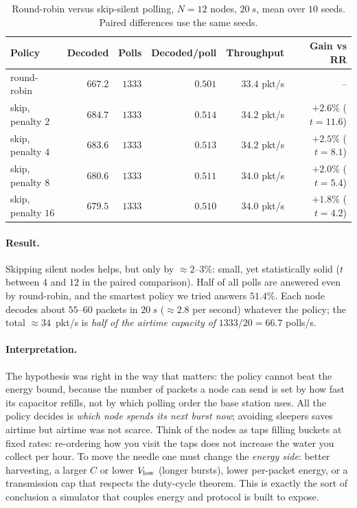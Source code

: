 \begin{table}[t]
\centering
\small
\caption{Round-robin versus skip-silent polling, $N=12$ nodes, $\SI{20}{s}$, mean over $10$ seeds. Paired differences use the same seeds.}
\label{tab:polling}
\renewcommand{\arraystretch}{1.1}
\begin{tabular}{@{}lrrrrr@{}}
\toprule
Policy & Decoded & Polls & Decoded/poll & Throughput & Gain vs RR\\
\midrule
round-robin & $667.2$ & $1333$ & $0.501$ & $33.4$ pkt/s & --\\
skip, penalty $2$ & $684.7$ & $1333$ & $0.514$ & $34.2$ pkt/s & $+2.6\%$ ($t=11.6$)\\
skip, penalty $4$ & $683.6$ & $1333$ & $0.513$ & $34.2$ pkt/s & $+2.5\%$ ($t=8.1$)\\
skip, penalty $8$ & $680.6$ & $1333$ & $0.511$ & $34.0$ pkt/s & $+2.0\%$ ($t=5.4$)\\
skip, penalty $16$ & $679.5$ & $1333$ & $0.510$ & $34.0$ pkt/s & $+1.8\%$ ($t=4.2$)\\
\bottomrule
\end{tabular}
\end{table}

\paragraph{Result.}
Skipping silent nodes helps, but only by $\approx2$--$3\%$: small, yet statistically solid ($t$ between $4$ and $12$ in the paired comparison). Half of all polls are answered even by round-robin, and the smartest policy we tried answers $51.4\%$. Each node decodes about $55$--$60$ packets in $\SI{20}{s}$ ($\approx2.8$ per second) whatever the policy; the total $\approx34$~pkt/s is \emph{half of the airtime capacity of} $1333/20=66.7$ polls/s.

\paragraph{Interpretation.}
The hypothesis was right in the way that matters: the policy cannot beat the energy bound, because the number of packets a node can send is set by how fast its capacitor refills, not by which polling order the base station uses. All the policy decides is \emph{which node spends its next burst now}; avoiding sleepers saves airtime but airtime was not scarce. Think of the nodes as taps filling buckets at fixed rates: re-ordering how you visit the taps does not increase the water you collect per hour. To move the needle one must change the \emph{energy side}: better harvesting, a larger $C$ or lower $V_{\mathrm{low}}$ (longer bursts), lower per-packet energy, or a transmission cap that respects the duty-cycle theorem. This is exactly the sort of conclusion a simulator that couples energy and protocol is built to expose.

